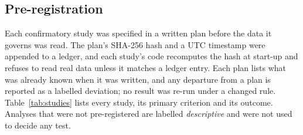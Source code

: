 \documentclass[12pt,letterpaper]{article}
\begin{document}
\subsection{Pre-registration}
\label{sec:prereg}

Each confirmatory study was specified in a written plan before the data it
governs was read. The plan's SHA-256 hash and a UTC timestamp were appended to a
ledger, and each study's code recomputes the hash at start-up and refuses to read
real data unless it matches a ledger entry. Each plan lists what was already
known when it was written, and any departure from a plan is reported as a
labelled deviation; no result was re-run under a changed rule.
Table~\ref{tab:studies} lists every study, its primary criterion and its outcome.
Analyses that were not pre-registered are labelled \emph{descriptive} and were
not used to decide any test.
\end{document}

